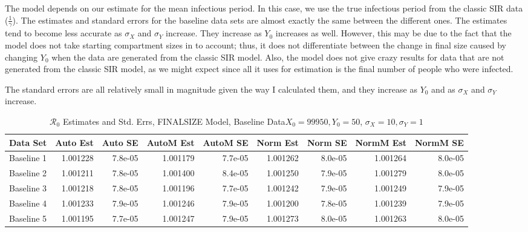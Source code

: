 \documentclass[12pt]{article}
\newcommand{\rr}{\ensuremath{\mathcal{R}_0}}
\begin{document}
The model depends on our estimate for the mean infectious period. In this case, we use the true infectious period from the classic SIR data ($\frac{1}{\gamma}$). The estimates and standard errors for the baseline data sets are almost exactly the same between the different ones. The estimates tend to become less accurate as $\sigma_X$ and $\sigma_Y$ increase. They increase as $Y_0$ increases as well. However, this may be due to the fact that the model does not take starting compartment sizes in to account; thus, it does not differentiate between the change in final size caused by changing $Y_0$ when the data are generated from the classic SIR model. Also, the model does not give crazy results for data that are not generated from the classic SIR model, as we might expect since all it uses for estimation is the final number of people who were infected.

The standard errors are all relatively small in magnitude given the way I calculated them, and they increase as $Y_0$ and as $\sigma_X$ and $\sigma_Y$ increase.

\begin{table}[H]
	
	\caption{$\rr$ Estimates and Std. Errs, FINALSIZE Model,
		Baseline Data$X_0 = 99950, Y_0 = 50$, 
		$\sigma_X = 10, \sigma_Y = 1$}
	\centering
	\begin{footnotesize}
		\hskip -1cm
	\begin{tabular}[t]{l|r|r|r|r|r|r|r|r}
		\hline
		Data Set & Auto Est & Auto SE & AutoM Est & AutoM SE & Norm Est & Norm SE & NormM Est & NormM SE\\
		\hline
		Baseline 1 & 1.001228 & 7.8e-05 & 1.001179 & 7.7e-05 & 1.001262 & 8.0e-05 & 1.001264 & 8.0e-05\\
		\hline
		Baseline 2 & 1.001211 & 7.8e-05 & 1.001400 & 8.4e-05 & 1.001250 & 7.9e-05 & 1.001279 & 8.0e-05\\
		\hline
		Baseline 3 & 1.001218 & 7.8e-05 & 1.001196 & 7.7e-05 & 1.001242 & 7.9e-05 & 1.001249 & 7.9e-05\\
		\hline
		Baseline 4 & 1.001233 & 7.9e-05 & 1.001246 & 7.9e-05 & 1.001200 & 7.8e-05 & 1.001239 & 7.9e-05\\
		\hline
		Baseline 5 & 1.001195 & 7.7e-05 & 1.001247 & 7.9e-05 & 1.001273 & 8.0e-05 & 1.001263 & 8.0e-05\\
		\hline
	\end{tabular}
	\end{footnotesize}
\end{table}
\end{document}
